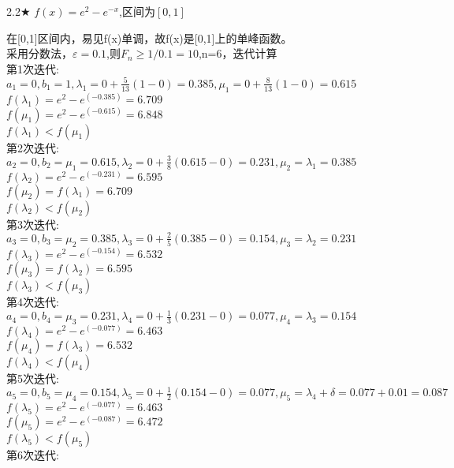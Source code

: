 \begin{problem}{2.2$\bigstar$}
    $f(x)=e^2-e^{-x}$,区间为$[0,1]$
\end{problem}
\begin{solution}
    在[0,1]区间内，易见f(x)单调，故f(x)是[0,1]上的单峰函数。\\
    采用分数法，$\varepsilon=0.1$,则$F_n\geq1/0.1=10$,n=6，迭代计算\\
    第1次迭代:\\
    $a_1=0,b_1=1,\lambda_1=0+\frac{5}{13}(1-0)=0.385,\mu_1=0+\frac{8}{13}(1-0)=0.615$\\
    $f(\lambda_1)=e^2-e^{(-0.385)}=6.709$\\
    $f(\mu_1)=e^2-e^{(-0.615)}=6.848$\\
    $f(\lambda_1)<f(\mu_1)$\\
    第2次迭代:\\
    $a_2=0,b_2=\mu_1=0.615,\lambda_2=0+\frac{3}{8}(0.615-0)=0.231,\mu_2=\lambda_1=0.385$\\
    $f(\lambda_2)=e^2-e^{(-0.231)}=6.595$\\
    $f(\mu_2)=f(\lambda_1)=6.709$\\
    $f(\lambda_2)<f(\mu_2)$\\
    第3次迭代:\\
    $a_3=0,b_3=\mu_2=0.385,\lambda_3=0+\frac{2}{5}(0.385-0)=0.154,\mu_3=\lambda_2=0.231$\\
    $f(\lambda_3)=e^2-e^{(-0.154)}=6.532$\\
    $f(\mu_3)=f(\lambda_2)=6.595$\\
    $f(\lambda_3)<f(\mu_3)$\\
    第4次迭代:\\
    $a_4=0,b_4=\mu_3=0.231,\lambda_4=0+\frac{1}{3}(0.231-0)=0.077,\mu_4=\lambda_3=0.154$\\
    $f(\lambda_4)=e^2-e^{(-0.077)}=6.463$\\
    $f(\mu_4)=f(\lambda_3)=6.532$\\
    $f(\lambda_4)<f(\mu_4)$\\
    第5次迭代:\\
    $a_5=0,b_5=\mu_4=0.154,\lambda_5=0+\frac{1}{2}(0.154-0)=0.077,\mu_5=\lambda_4+\delta=0.077+0.01=0.087$\\
    $f(\lambda_5)=e^2-e^{(-0.077)}=6.463$\\
    $f(\mu_5)=e^2-e^{(-0.087)}=6.472$\\
    $f(\lambda_5)<f(\mu_5)$\\
    第6次迭代:\\

\end{solution}
